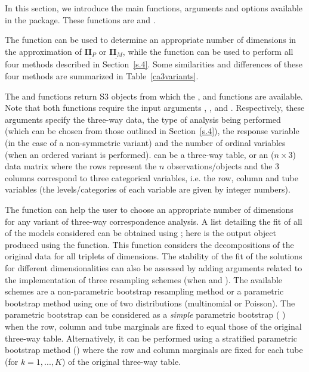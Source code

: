 In this section, we introduce the main functions, arguments and options available in the  package. These functions are   and .

The  function can be used to determine an appropriate number of dimensions in the approximation of $\underline{\bm{\Pi}_{P}}$ or $\underline{\bm{\Pi}_{M}}$, while the  function    can be used to perform all four methods described in Section~\ref{s.4}. Some similarities and differences  of these four methods are summarized in Table~\ref{ca3variants}.

The  and  functions return S3 objects from which the ,  and  functions are available.  Note that both functions require the input arguments , ,  and . Respectively, these arguments specify the three-way data, the type of analysis being performed (which can be chosen from those outlined in Section~\ref{s.4}), the response variable (in the case of a non-symmetric variant) and the number of ordinal variables (when an ordered variant is performed).  can be a three-way table, or an ($n\times 3$) data matrix where the rows represent the $n$ observations/objects and the $3$ columns correspond to three categorical variables, i.e. the row, column and tube variables (the levels/categories of each variable are given by integer numbers).

The  function can help the user to choose an appropriate number of dimensions  for any variant of three-way correspondence analysis. A list detailing the fit of all of the models considered can be obtained using ; here  is the output object produced using the  function. This function  considers the decompositions of the original data for all triplets of  dimensions. The stability of the fit of the solutions for different dimensionalities can also be assessed by adding arguments related to the implementation of three resampling schemes (when  and  ). The available schemes are a non-parametric bootstrap resampling method or a parametric bootstrap method using one of two  distributions (multinomial or Poisson). The parametric bootstrap can be considered as a {\it simple} parametric bootstrap  ( ) when the row, column and tube marginals are fixed to equal those of the original three-way table. Alternatively, it can be performed using a  stratified parametric bootstrap method () where the row and column marginals are fixed for each  tube (for $k= 1,...,K$) of the original three-way table. 


